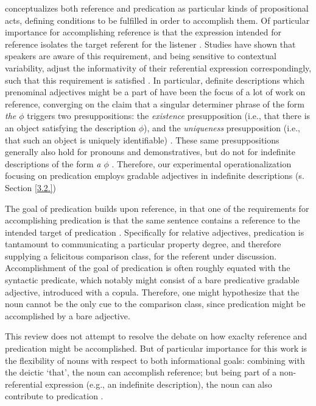 \textcite{searle1969speech} conceptualizes both reference and predication as particular kinds of propositional acts, defining conditions to be fulfilled in order to accomplish them. Of particular importance for accomplishing reference is that the expression intended for reference isolates the target referent for the listener \parencite{searle1969speech}. Studies have shown that speakers are aware of this requirement, and being sensitive to contextual variability, adjust the informativity of their referential expression correspondingly, such that this requirement is satisfied \parencite[e.g.,][]{graf2016animal}. In particular, definite descriptions which prenominal adjectives might be a part of have been the focus of a lot of work on reference, converging on the claim that a singular determiner phrase of the form \emph{the $\phi$} triggers two presuppositions: the \textit{existence} presupposition (i.e., that there is an object satisfying the description $\phi$), and the \textit{uniqueness} presupposition (i.e., that such an object is uniquely identifiable) \parencite{syrett2010meaning, michaelson2019}. These same presuppositions generally also hold for pronouns and demonstratives, but do not for indefinite descriptions of the form \textit{a $\phi$} \parencite{braun2017, Reboul2001}. Therefore, our experimental operationalization focusing on predication employs gradable adjectives in indefinite descriptions (s. Section \ref{3.2.})

The goal of predication builds upon reference, in that one of the requirements for accomplishing predication is that the same sentence contains a reference to the intended target of predication \parencite{searle1969speech, Reboul2001}. Specifically for relative adjectives, predication is tantamount to communicating a particular property degree, and therefore supplying a felicitous comparison class, for the referent under discussion. Accomplishment of the goal of predication is often roughly equated with the syntactic predicate, which notably might consist of a bare predicative gradable adjective, introduced with a copula. Therefore, one might hypothesize that the noun cannot be the only cue to the comparison class, since predication might be accomplished by a bare adjective.

This review does not attempt to resolve the debate on how exaclty reference and predication might be accomplished. But of particular importance for this work is the flexibility of nouns with respect to both informational goals: combining with the deictic ‘that’, the noun can accomplish reference; but being part of a non-referential expression (e.g., an indefinite description), the noun can also contribute to predication \parencite{Reboul2001}. 

